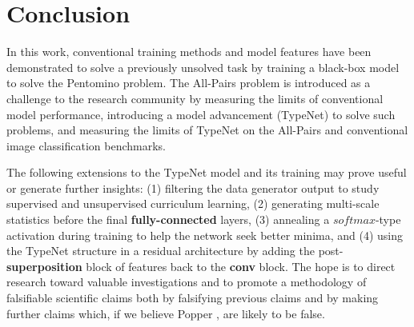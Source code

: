 \section{Conclusion}

In this work, conventional training methods and model features have been
demonstrated to solve a previously unsolved task by training a black-box
model to solve the Pentomino problem.  The All-Pairs problem is
introduced as a challenge to the research community by measuring the
limits of conventional model performance, introducing a model
advancement (TypeNet) to solve such problems, and measuring the limits
of TypeNet on the All-Pairs and conventional image classification
benchmarks.

The following extensions to the TypeNet model and its training may
prove useful or generate further insights: (1) filtering the data
generator output to study supervised and unsupervised curriculum
learning, (2) generating multi-scale statistics before
the final \textbf{fully-connected} layers, (3) annealing a $softmax$-type
activation during training to help the network seek better minima,
and (4) using the TypeNet structure in a residual architecture by adding the
post-\textbf{superposition} block of features back to the \textbf{conv}
block.  The hope is to direct research toward valuable investigations
and to promote a methodology of falsifiable scientific claims both by
falsifying previous claims and by making further claims which, if we believe
Popper \cite{popper59}, are likely to be false.
